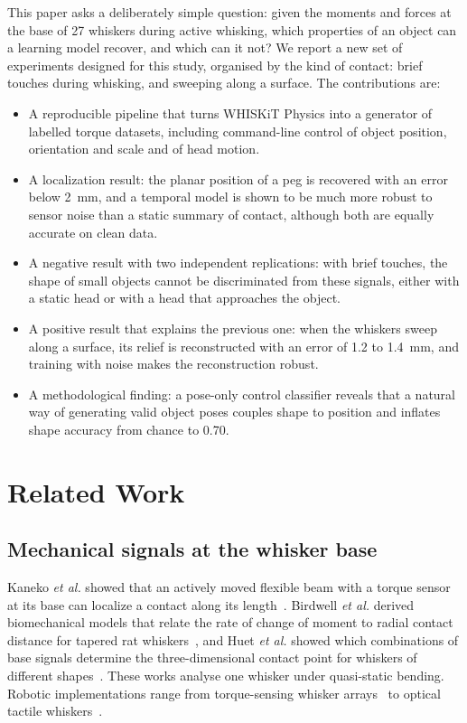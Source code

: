 \documentclass[conference]{IEEEtran}
\begin{document}
This paper asks a deliberately simple question: given the moments and forces at the base of 27 whiskers during active whisking, which properties of an object can a learning model recover, and which can it not? We report a new set of experiments designed for this study, organised by the kind of contact: brief touches during whisking, and sweeping along a surface. The contributions are:
\begin{itemize}
\item A reproducible pipeline that turns WHISKiT Physics into a generator of labelled torque datasets, including command-line control of object position, orientation and scale and of head motion.
\item A localization result: the planar position of a peg is recovered with an error below 2~mm, and a temporal model is shown to be much more robust to sensor noise than a static summary of contact, although both are equally accurate on clean data.
\item A negative result with two independent replications: with brief touches, the shape of small objects cannot be discriminated from these signals, either with a static head or with a head that approaches the object.
\item A positive result that explains the previous one: when the whiskers sweep along a surface, its relief is reconstructed with an error of 1.2 to 1.4~mm, and training with noise makes the reconstruction robust.
\item A methodological finding: a pose-only control classifier reveals that a natural way of generating valid object poses couples shape to position and inflates shape accuracy from chance to 0.70.
\end{itemize}

\section{Related Work}
\subsection{Mechanical signals at the whisker base}
Kaneko \emph{et al.} showed that an actively moved flexible beam with a torque sensor at its base can localize a contact along its length~\cite{kaneko1998}. Birdwell \emph{et al.} derived biomechanical models that relate the rate of change of moment to radial contact distance for tapered rat whiskers~\cite{birdwell2007}, and Huet \emph{et al.} showed which combinations of base signals determine the three-dimensional contact point for whiskers of different shapes~\cite{huet2017}. These works analyse one whisker under quasi-static bending. Robotic implementations range from torque-sensing whisker arrays~\cite{solomon2006,pearson2011} to optical tactile whiskers~\cite{lepora2018}.
\end{document}
